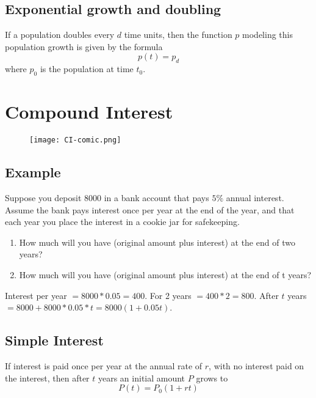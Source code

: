 \subsection{Exponential growth and doubling}
If a population doubles every \( d \) time units, then the function \( p \) modeling this population growth is given by the formula
\[ p(t) = p_{d} \]
where \(p_{0}\) is the population at time \(t_{0}\).

\section{Compound Interest}
\begin{figure}
  \texttt{[image: CI-comic.png]}
\end{figure}

\subsection{Example}
Suppose you deposit \(8000\) in a bank account that pays \(5\%\) annual interest. Assume the bank pays interest once per year at the end of the year, and that each year you place the interest in a cookie jar for safekeeping.
\begin{enumerate}
  \item  How much will you have (original amount plus interest) at the end of two years?
  \item How much will you have (original amount plus interest) at the end of t years?
\end{enumerate}
Interest per year \( = 8000*0.05 = 400 \). For 2 years \( = 400*2 = 800\).
After \(t\) years \(= 8000 + 8000*0.05*t = 8000(1+0.05t)\).

\subsection{Simple Interest}
If interest is paid once per year at the annual rate of \(r\), with no interest paid on the interest, then after \(t\) years
an initial amount \(P\) grows to
\[ P(t) = P_{0}(1 + rt) \]

